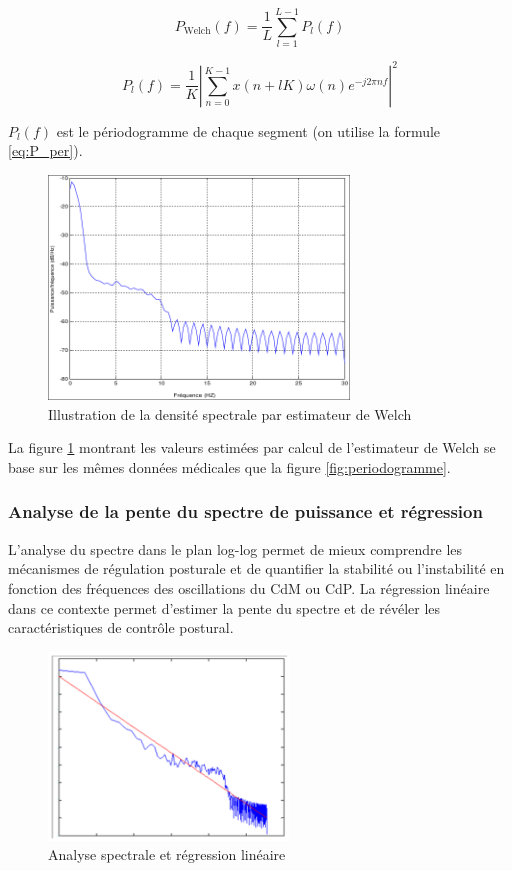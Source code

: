 \begin{equation}
  P_{\text{Welch}}(f)=\frac{1}{L}\sum\limits_{l=1}^{L-1}P_l(f)
  \label{eq:P_Welch}
\end{equation}

\begin{equation} 
  P_l(f) = \frac{1}{K}\left|\sum\limits_{n=0}^{K-1}x(n+lK)\omega(n)e^{-j2\pi nf}\right|^2
  \label{eq:P_l}
\end{equation}

$P_l(f)$ est le périodogramme de chaque segment (on utilise la formule \ref{eq:P_per}).

\begin{figure}[ht]
  \centering
  \includegraphics[width=8cm]{images/methode/welch.png}
  \caption{Illustration de la densité spectrale par estimateur de Welch}
  \label{fig:welch}
\end{figure}

La figure \ref{fig:welch} montrant les valeurs estimées par calcul de l'estimateur de Welch se base sur les mêmes données médicales que la figure \ref{fig:periodogramme}.

\subsubsection{Analyse de la pente du spectre de puissance et régression}
\label{subsubsec:pente}

L’analyse du spectre dans le plan log-log permet de mieux comprendre les mécanismes de régulation posturale et de quantifier la stabilité ou l’instabilité en fonction des fréquences des oscillations du CdM ou CdP. 
La régression linéaire dans ce contexte permet d’estimer la pente du spectre et de révéler les caractéristiques de contrôle postural.

\begin{figure}[H]
    \centering
    \includegraphics[height=5cm]{images/methode/analyse_spec_regre_lin.png}
    \caption{Analyse spectrale et régression linéaire}\label{fig:regression_lineaire}
\end{figure}

